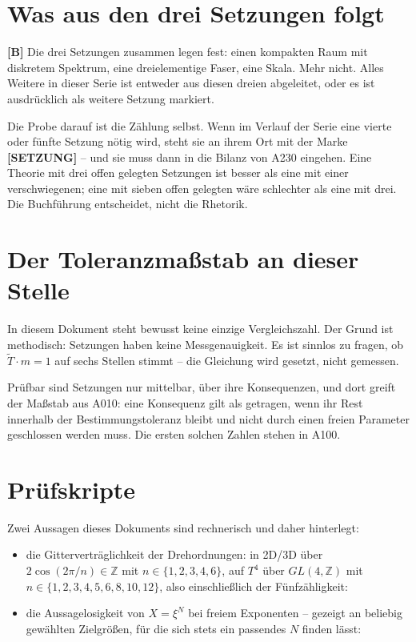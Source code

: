 \section{Was aus den drei Setzungen folgt}

\textbf{[B]} Die drei Setzungen zusammen legen fest: einen kompakten Raum mit
diskretem Spektrum, eine dreielementige Faser, eine Skala. Mehr nicht. Alles
Weitere in dieser Serie ist entweder aus diesen dreien abgeleitet, oder es ist
ausdrücklich als weitere Setzung markiert.

Die Probe darauf ist die Zählung selbst. Wenn im Verlauf der Serie eine vierte
oder fünfte Setzung nötig wird, steht sie an ihrem Ort mit der Marke
\textbf{[SETZUNG]} -- und sie muss dann in die Bilanz von A230 eingehen. Eine
Theorie mit drei offen gelegten Setzungen ist besser als eine mit einer
verschwiegenen; eine mit sieben offen gelegten wäre schlechter als eine mit
drei. Die Buchführung entscheidet, nicht die Rhetorik.

\section{Der Toleranzmaßstab an dieser Stelle}

In diesem Dokument steht bewusst keine einzige Vergleichszahl. Der Grund ist
methodisch: Setzungen haben keine Messgenauigkeit. Es ist sinnlos zu fragen, ob
$\tilde T\cdot m = 1$ auf sechs Stellen stimmt -- die Gleichung wird gesetzt,
nicht gemessen.

Prüfbar sind Setzungen nur mittelbar, über ihre Konsequenzen, und dort greift
der Maßstab aus A010: eine Konsequenz gilt als getragen, wenn ihr Rest
innerhalb der Bestimmungstoleranz bleibt und nicht durch einen freien Parameter
geschlossen werden muss. Die ersten solchen Zahlen stehen in A100.

\section{Prüfskripte}

Zwei Aussagen dieses Dokuments sind rechnerisch und daher hinterlegt:

\begin{itemize}
  \item die Gitterverträglichkeit der Drehordnungen: in 2D/3D über
    $2\cos(2\pi/n)\in\mathbb{Z}$ mit $n\in\{1,2,3,4,6\}$, auf $T^4$ über
    $GL(4,\mathbb{Z})$ mit $n\in\{1,2,3,4,5,6,8,10,12\}$, also einschließlich
    der Fünfzähligkeit:
  \item die Aussagelosigkeit von $X=\xi^N$ bei freiem Exponenten -- gezeigt an
    beliebig gewählten Zielgrößen, für die sich stets ein passendes $N$ finden
    lässt: 
\end{itemize}

